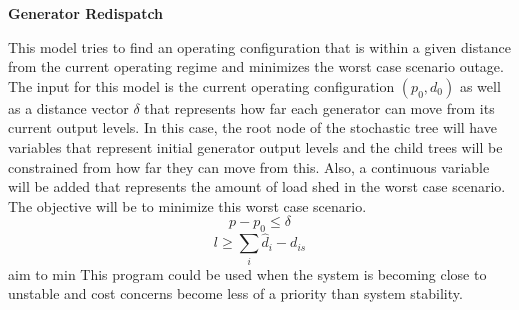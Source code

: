 \textbf{Generator Redispatch}

This model tries to find an operating configuration that is within a given distance from the current operating regime and minimizes the worst case scenario outage.  The input for this model is the current operating configuration $(p_0, d_0)$ as well as a distance vector $\delta$ that represents how far each generator can move from its current output levels.  In this case, the root node of the stochastic tree will have variables that represent initial generator output levels and the child trees will be constrained from how far they can move from this.  Also, a continuous variable will be added that represents the amount of load shed in the worst case scenario.  The objective will be to minimize this worst case scenario.  
\begin{equation}
p - p_0 \le \delta
\end{equation}
\begin{equation}
l \ge \sum_i \hat{d}_i - d_{is}
\end{equation}
aim to min 
This program could be used when the system is becoming close to unstable and cost concerns become less of a priority than system stability.
